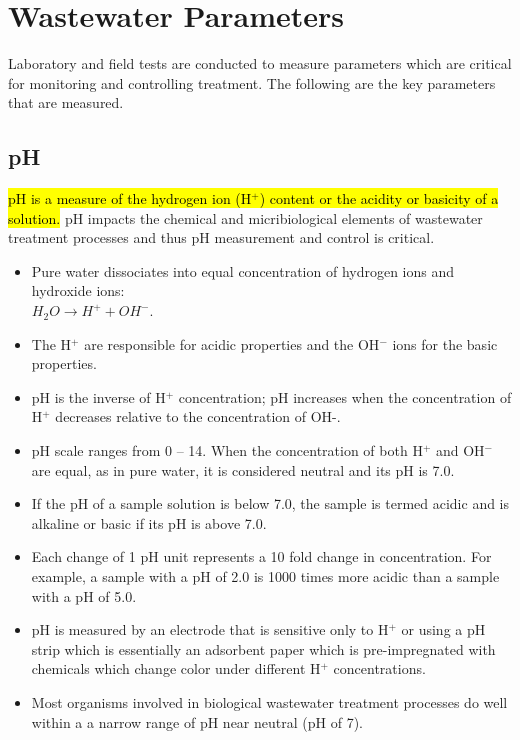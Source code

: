 \section{Wastewater Parameters}			
		Laboratory and field tests are conducted to measure parameters which are critical for monitoring and controlling treatment.  The following are the key parameters that are measured.	
			
\subsection{pH}	
			\hl{pH is a measure of the hydrogen ion (H$^+$) content or the acidity or basicity of a solution.}  pH impacts the chemical and micribiological elements of wastewater treatment processes and thus pH measurement and control is critical.
			\begin{itemize}
				\item Pure water dissociates into equal concentration of hydrogen ions and hydroxide ions:\\ 
				      $H_2O \rightarrow H^+ + OH^-$.
				\item The H$^+$ are responsible for acidic properties and the OH$^-$ ions for the basic properties.  
				\item pH is the inverse of H$^+$ concentration; pH increases when the concentration of H$^+$ decreases relative to the concentration of OH-. 
				\item pH scale ranges from 0 – 14. When the concentration of both H$^+$ and OH$^-$ are equal, as in pure water, it is considered neutral and its pH is 7.0.  \item If the pH of a sample solution is below 7.0, the sample is termed acidic and is alkaline or basic if its pH is above 7.0. 
				\item Each change of 1 pH unit represents a 10 fold change in concentration.  For example, a sample with a pH of 2.0 is 1000 times more acidic than a sample with a pH of 5.0. 
				\item pH is measured by an electrode that is sensitive only to H$^+$ or using a pH strip which is essentially an adsorbent paper which is pre-impregnated with chemicals which change color under different H$^+$ concentrations.
				\item Most organisms involved in biological wastewater treatment processes do well within a a narrow range of pH near neutral (pH of 7).			
			\end{itemize}
			
